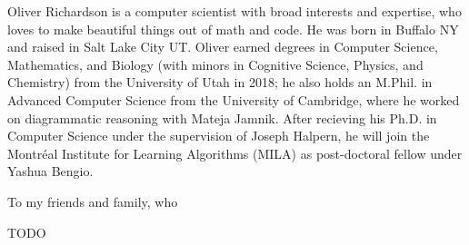 \documentclass[tocprelim,
    ]{cornellmodified}
\begin{document}
\begin{biosketch}
Oliver Richardson is a computer scientist 
    with broad interests and expertise,
    who loves to make beautiful things out of math and code.
He was born in Buffalo NY and raised in Salt Lake City UT. 
Oliver earned degrees in Computer Science, Mathematics, and Biology (with minors in Cognitive Science, Physics, and Chemistry)
    from the University of Utah in 2018;
he also holds an M.Phil. in Advanced Computer Science from the University of Cambridge, where he worked on diagrammatic reasoning with Mateja Jamnik. 
%
After recieving his Ph.D. in Computer Science under the supervision of Joseph Halpern, he will join the Montr\'{e}al Institute for Learning Algorithms (MILA) as post-doctoral fellow under Yashua Bengio.
\end{biosketch}

\begin{dedication}
To my friends and family, who 
\end{dedication}

\begin{acknowledgements}
TODO


\end{acknowledgements}

\contentspage
\figurelistpage

\normalspacing \setcounter{page}{1} 
\pagestyle{cornell} \addtolength{\parskip}{0.5\baselineskip}
\end{document}
